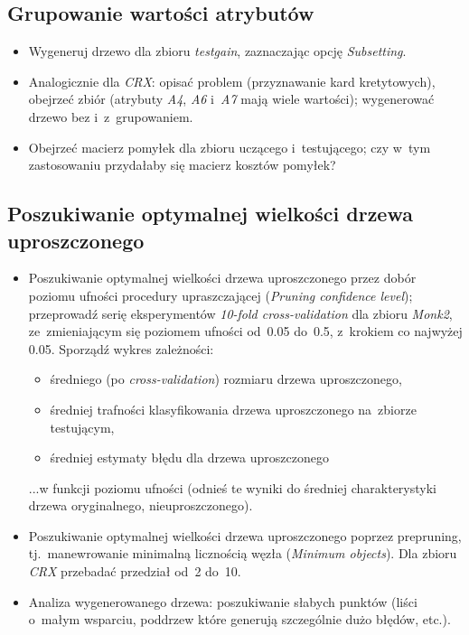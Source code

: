 \documentclass{article}
\begin{document}
\subsection{Grupowanie wartości atrybutów}

\begin{itemize}
\item Wygeneruj drzewo dla zbioru \emph{testgain}, zaznaczając opcję \emph{Subsetting}.
\item Analogicznie dla \emph{CRX}: opisać problem (przyznawanie kard kretytowych), obejrzeć zbiór (atrybuty \emph{A4}, \emph{A6} i~\emph{A7} mają wiele wartości); wygenerować drzewo bez i~z~grupowaniem.
\item Obejrzeć macierz pomyłek dla zbioru uczącego i~testującego; czy w~tym zastosowaniu przydałaby się macierz kosztów pomyłek?
\end{itemize}

\subsection{Poszukiwanie optymalnej wielkości drzewa uproszczonego}

\begin{itemize}
\item Poszukiwanie optymalnej wielkości drzewa uproszczonego przez dobór poziomu ufności procedury upraszczającej (\emph{Pruning confidence level}); przeprowadź serię eksperymentów \emph{10-fold cross-validation} dla zbioru \emph{Monk2}, ze~zmieniającym się poziomem ufności od~0.05 do~0.5, z~krokiem co najwyżej 0.05. Sporządź wykres zależności:

\begin{itemize}
\item średniego (po \emph{cross-validation}) rozmiaru drzewa uproszczonego,
\item średniej trafności klasyfikowania drzewa uproszczonego na~zbiorze testującym,
\item średniej estymaty błędu dla drzewa uproszczonego
\end{itemize}

...w funkcji poziomu ufności (odnieś te wyniki do średniej charakterystyki drzewa oryginalnego, nieuproszczonego).

\item Poszukiwanie optymalnej wielkości drzewa uproszczonego poprzez prepruning, tj.~manewrowanie minimalną licznością węzła (\emph{Minimum objects}). Dla zbioru \emph{CRX} przebadać przedział od~2 do~10.
\item Analiza wygenerowanego drzewa: poszukiwanie słabych punktów (liści o~małym wsparciu, poddrzew które generują szczególnie dużo błędów, etc.).
\end{itemize}
\end{document}
